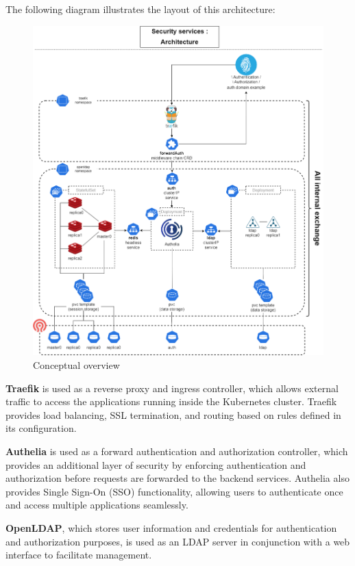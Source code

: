 The following diagram illustrates the layout of this architecture: 

\begin{figure}[H]\centering
\includegraphics[width=1.0\textwidth,angle=00]{assets/f51.png}
\caption{Conceptual overview }
\label{fig:f51}
\end{figure}

\textbf{Traefik} is used as a reverse proxy and ingress controller, which allows external traffic to access the applications running inside the Kubernetes cluster. Traefik provides load balancing, SSL termination, and routing based on rules defined in its configuration. 

\textbf{Authelia} is used as a forward authentication and authorization controller, which provides an additional layer of security by enforcing authentication and authorization before requests are forwarded to the backend services. Authelia also provides Single Sign-On (SSO) functionality, allowing users to authenticate once and access multiple applications seamlessly. 

\textbf{OpenLDAP}, which stores user information and credentials for authentication and authorization purposes, is used as an LDAP server in conjunction with a web interface to facilitate management. 

